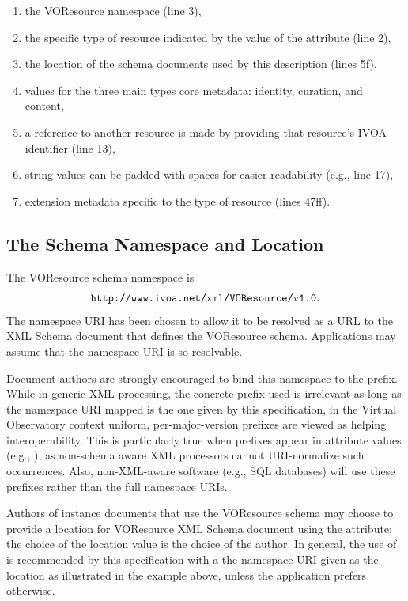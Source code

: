 \documentclass[11pt,a4paper]{ivoa}
\begin{document}
\begin{enumerate}
  \item the VOResource namespace (line 3),
  \item the specific type of resource indicated by
       the value of the  attribute (line 2),
  \item the location of the schema documents used by
       this description (lines 5f),
  \item values for the three main types core metadata:
       identity, curation, and content,
  \item a reference to another resource is made by
       providing that resource's IVOA identifier (line 13),
  \item string values can be padded with spaces
       for easier readability (e.g., line 17),
  \item extension metadata specific to the type of
       resource (lines 47ff).
\end{enumerate}


\subsection{The Schema Namespace and Location}

\label{sect:namespace}


The VOResource schema namespace is 
$$\hbox{\texttt{http://www.ivoa.net/xml/VOResource/v1.0}}.$$
The namespace URI has been chosen to allow it to be resolved as a URL
to the XML Schema document that defines the VOResource schema.
Applications may assume that the namespace URI is so resolvable.

Document authors are strongly encouraged to bind this namespace to the
 prefix.  While in generic XML processing, the concrete
prefix used is irrelevant as long as the namespace URI mapped is the one
given by this specification, in the Virtual Observatory context uniform,
per-major-version prefixes are viewed as helping interoperability.  This
is particularly true when prefixes appear in attribute values (e.g.,
), as non-schema aware XML processors cannot
URI-normalize such occurrences.  Also, non-XML-aware software (e.g., SQL
databases) will use these prefixes rather than the full namespace URIs.

Authors of instance documents that use the VOResource schema may choose
to provide a location for VOResource XML Schema document using the
 attribute; the choice of the location value
is the choice of the author.  In general, the use of
 is recommended by this specification with
a the namespace URI given as the location as illustrated in the example
above, unless the application prefers otherwise.
\end{document}
